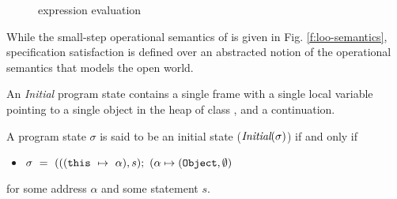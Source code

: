 \begin{figure}[t]
\begin{minipage}{\textwidth}
\begin{minipage}{\textwidth}
\caption{\LangOO expression evaluation}
\label{f:evaluation}
\end{minipage}
\end{minipage}
\end{figure}

While the small-step operational semantics of \LangOO is given in Fig. \ref{f:loo-semantics},
specification satisfaction is defined over an abstracted notion of 
the operational semantics that models the open world. %




An \emph{Initial} program state contains a single frame 
with a single local variable  pointing to a single object 
in the heap of class , and a continuation.
\begin{definition}
\label{def:initial}
A program state $\sigma$ is said to be an initial state ($\textit{Initial}(\sigma)$)
if and only if
\begin{itemize}
\item
$\sigma\ =\  ( ((\prg{this}\ \mapsto\ \alpha), s); \  (\alpha \mapsto (\prg{Object}, \emptyset)$
\end{itemize} 
for some address $\alpha$ and some statement $s$.
\end{definition}


